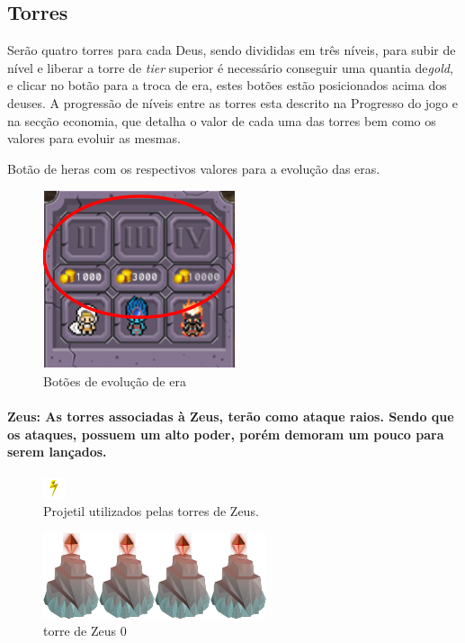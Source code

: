 \documentclass[11pt]{article} %
\begin{document}
\newpage


\subsection{Torres}
Serão quatro torres para cada Deus, sendo divididas em três níveis, para subir de nível e liberar a torre de \textit{tier} superior é necessário conseguir uma quantia de\textit{gold}, e clicar no botão para a troca de era, estes botões estão posicionados acima dos deuses. A progressão de níveis entre as torres esta descrito na Progresso do jogo e na secção economia, que detalha o valor de cada uma das torres bem como os valores para evoluir as mesmas.

Botão de heras com os respectivos valores para a evolução das eras.
\begin{figure}[!htp]
\centering
\includegraphics[scale=1]{res/era_button.png}
\caption{Botões de evolução de era}
\label{Butões de evolução de era}
\end{figure}

\paragraph{{\Large Zeus}: As torres associadas à Zeus, terão como ataque raios. Sendo que os ataques, possuem um alto poder, porém demoram um pouco para serem lançados.}

\begin{figure}[!htp]
\centering
\includegraphics[scale=1]{res/projectiles/projetil_zeus2.png}
\caption{Projetil utilizados pelas torres de Zeus.}
\end{figure}

\begin{figure}[!htp]
\centering
\includegraphics[scale=1]{res/towers/tower_0.png}
\caption{torre de Zeus 0}
\end{figure}
\end{document}
